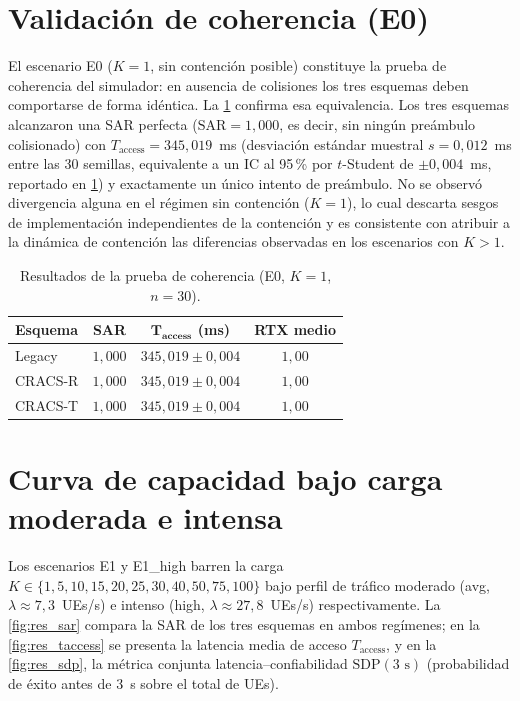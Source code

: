 \section{Validación de coherencia (E0)}
\label{sec:res_e0}

El escenario E0 ($K=1$, sin contención posible) constituye la prueba de coherencia del simulador: en ausencia de colisiones los tres esquemas deben comportarse de forma idéntica. La \cref{tab:res_e0} confirma esa equivalencia. Los tres esquemas alcanzaron una SAR perfecta ($\mathrm{SAR}=1{,}000$, es decir, sin ningún preámbulo colisionado) con $T_{\text{access}} = 345{,}019$~ms (desviación estándar muestral $s = 0{,}012$~ms entre las 30 semillas, equivalente a un IC al 95\,\% por $t$-Student de $\pm 0{,}004$~ms, reportado en \cref{tab:res_e0}) y exactamente un único intento de preámbulo. No se observó divergencia alguna en el régimen sin contención ($K=1$), lo cual descarta sesgos de implementación independientes de la contención y es consistente con atribuir a la dinámica de contención las diferencias observadas en los escenarios con $K>1$.

\begin{table}[H]
\centering
\caption{Resultados de la prueba de coherencia (E0, $K=1$, $n=30$).}
\label{tab:res_e0}
\small
\renewcommand{\arraystretch}{1.15}
\begin{tabular}{@{}l c c c@{}}
\toprule
\textbf{Esquema} & \textbf{SAR} & $\boldsymbol{T_{\text{access}}}$ \textbf{(ms)} & \textbf{RTX medio} \\
\midrule
Legacy   & $1{,}000$ & $345{,}019 \pm 0{,}004$ & $1{,}00$ \\
CRACS-R  & $1{,}000$ & $345{,}019 \pm 0{,}004$ & $1{,}00$ \\
CRACS-T  & $1{,}000$ & $345{,}019 \pm 0{,}004$ & $1{,}00$ \\
\bottomrule
\end{tabular}
\end{table}

\section{Curva de capacidad bajo carga moderada e intensa}
\label{sec:res_e1}

Los escenarios E1 y E1\_high barren la carga $K \in \{1, 5, 10, 15, 20, 25, 30, 40, 50, 75, 100\}$ bajo perfil de tráfico moderado (avg, $\lambda \approx 7{,}3$~UEs/s) e intenso (high, $\lambda \approx 27{,}8$~UEs/s) respectivamente. La \cref{fig:res_sar} compara la SAR de los tres esquemas en ambos regímenes; en la \cref{fig:res_taccess} se presenta la latencia media de acceso $T_{\text{access}}$, y en la \cref{fig:res_sdp}, la métrica conjunta latencia--confiabilidad $\mathrm{SDP}(3\text{~s})$ (probabilidad de éxito antes de 3~s sobre el total de UEs).


